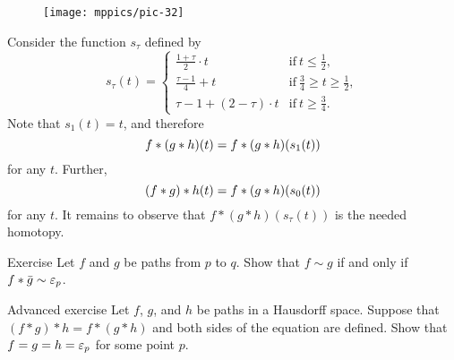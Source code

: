\begin{wrapfigure}[3]{r}{30mm}
\centering
\vskip-4mm
\texttt{[image: mppics/pic-32]}
\end{wrapfigure}

Consider the function $s_\tau$ defined by 
\[s_\tau(t)=
\begin{cases}
\tfrac{1+\tau}2\cdot t&\text{if}\ t\le \tfrac12,
\\
\tfrac{\tau-1}4+t&\text{if}\ \tfrac 34\ge t\ge \tfrac12,
\\
\tau-1+ (2-\tau)\cdot t&\text{if}\  t\ge \tfrac34.
\end{cases}
\]
Note that $s_1(t)=t$,
and therefore \[f*(g*h)(t)\z=f*(g*h)(s_1(t))\] for any $t$.
Further, 
\[(f*g)*h(t)\z=f*(g*h)(s_0(t))\] for any $t$.
It remains to observe that $f*(g*h)(s_\tau(t))$ is the needed homotopy.
\qeds

\begin{thm}{Exercise}
Let $f$ and $g$ be paths from $p$ to $q$.
Show that $f\sim g$ if and only if $f*\bar g\sim \varepsilon_p$.
\end{thm}


\begin{thm}{Advanced exercise}\label{ex:assoc}
Let $f$, $g$, and $h$ be paths in a Hausdorff space.
Suppose that $(f*g)*h= f*(g*h)$
and both sides of the equation are defined.
Show that $f=g=h=\varepsilon_p$ for some point $p$.
\end{thm}
